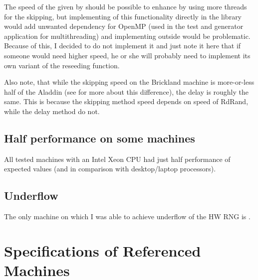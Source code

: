 
The speed of the given by  should be possible to enhance by using more threads for the skipping, but implementing of this functionality directly in the library would add unwanted dependency for OpenMP (used in the test and generator application for multithreading) and implementing outside would be problematic. Because of this, I decided to do not implement it and just note it here that if someone would need higher speed, he or she will probably need to implement its own variant of the reseeding function.

Also note, that while the skipping speed on the Brickland machine is more-or-less half of the Aladdin (see  for more about this difference), the delay is roughly the same. This is because the skipping method speed depends on speed of RdRand, while the delay method do not.

\subsection{Half performance on some machines}\label{subsec:testing:halfPerf}
All tested machines with an Intel Xeon CPU had just half performance of expected values (and in comparison with desktop/laptop processors).


\subsection{Underflow}
The only machine on which I was able to achieve underflow of the HW RNG is .



\section{Specifications of Referenced Machines}



